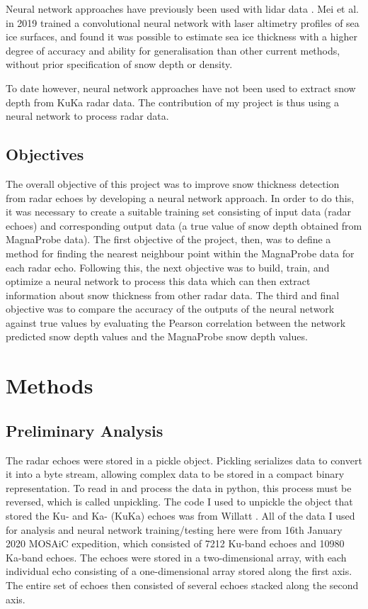 \documentclass[11pt, a4paper]{article}
\begin{document}
Neural network approaches have previously been used with lidar data \cite{mei}.  Mei et al.  in 2019 trained a convolutional neural network with laser altimetry profiles of sea ice surfaces, and found it was possible to estimate sea ice thickness with a higher degree of accuracy and ability for generalisation than other current methods, without prior specification of snow depth or density.

To date however,  neural network approaches have not been used to extract snow depth from KuKa radar data.  The contribution of my project is thus using a neural network to process radar data.

\subsection{Objectives}
The overall objective of this project was to improve snow thickness detection from radar echoes by developing a neural network approach.  In order to do this,  it was necessary to create a suitable training set consisting of input data (radar echoes) and corresponding output data (a true value of snow depth obtained from MagnaProbe data).  The first objective of the project,  then,  was to define a method for finding the nearest neighbour point within the MagnaProbe data for each radar echo.  Following this, the next objective was to build,  train,  and optimize a neural network to process this data which can then extract information about snow thickness from other radar data. The third and final objective was to compare the accuracy of the outputs of the neural network against true values by  evaluating the Pearson correlation between the network predicted snow depth values and the MagnaProbe snow depth values.

\section{Methods}

\subsection{Preliminary Analysis}
The radar echoes were stored in a pickle object.  Pickling serializes data to convert it into a byte stream, allowing complex data to be stored in a compact binary representation. To read in and process the data in python, this process must be reversed,  which is called unpickling.  The code I used to unpickle the object that stored the Ku- and Ka- (KuKa) echoes was from Willatt \cite{stroeve}.  All of the data I used for analysis and neural network training/testing here were from 16th January 2020 MOSAiC expedition, which consisted of 7212 Ku-band echoes and 10980 Ka-band echoes.  The echoes were stored in a two-dimensional array, with each individual echo consisting of a one-dimensional array stored along the first axis. The entire set of echoes then consisted of several echoes stacked along the second axis.
\end{document}
